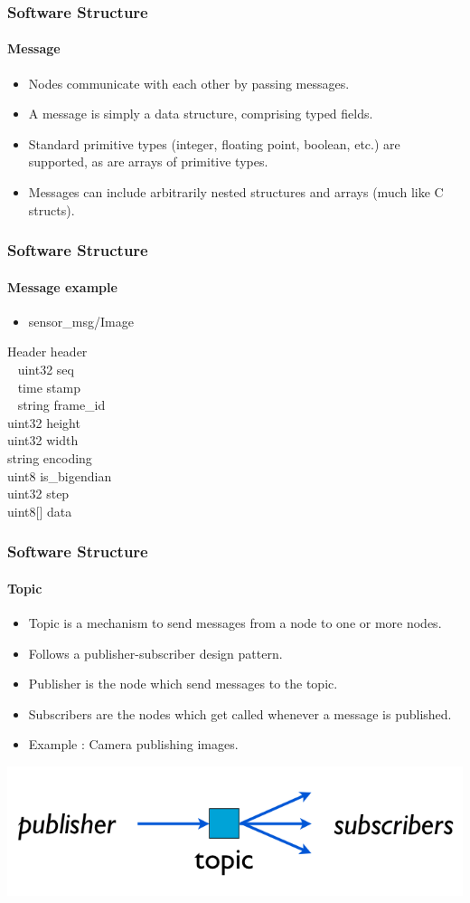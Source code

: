 \documentclass{beamer}
\begin{document}
\begin{frame}
\frametitle{Software Structure}
\framesubtitle{Message}

\begin{itemize}
  \item Nodes communicate with each other by passing messages.
  \item A message is simply a data structure, comprising typed fields. 
  \item Standard primitive types (integer, floating point, boolean, etc.) are supported, as are arrays of primitive types. 
  \item Messages can include arbitrarily nested structures and arrays (much like C structs).
\end{itemize}
\end{frame}

\begin{frame}
\frametitle{Software Structure}
\framesubtitle{Message example}

\begin{itemize}
  \item sensor\_msg/Image
\end{itemize}

Header header \\
~  uint32 seq \\
~  time stamp \\
~  string frame\_id \\
uint32 height \\
uint32 width \\
string encoding \\
uint8 is\_bigendian \\
uint32 step \\
uint8[] data
\end{frame}

\begin{frame}
\frametitle{Software Structure}
\framesubtitle{Topic}

\begin{itemize}
  \item Topic is a mechanism to send messages from a node to one or more nodes.
  \item Follows a publisher-subscriber design pattern.
  \item Publisher is the node which send messages to the topic.
  \item Subscribers are the nodes which get called whenever a message is published.
  \item Example : Camera publishing images.
\end{itemize}

\begin{center}
  \includegraphics[width=.6\textwidth]{topic}
\end{center}

\end{frame}
\end{document}
